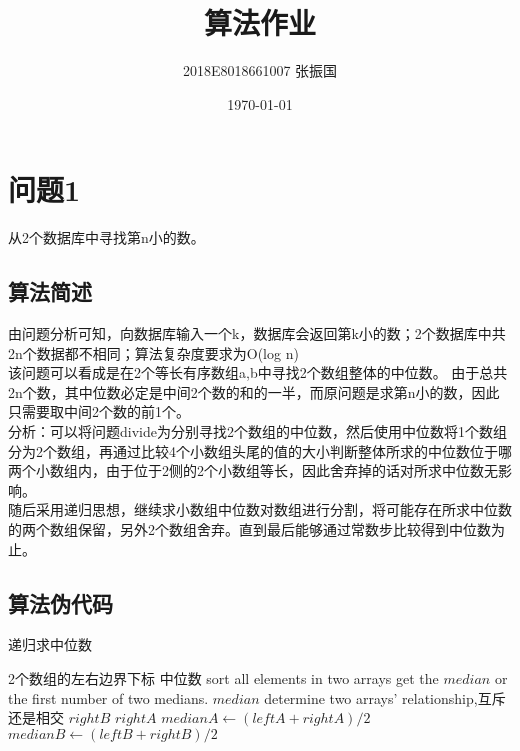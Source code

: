 \documentclass[UTF8]{ctexart}
\title{算法作业}
\author{2018E8018661007   张振国}
\date{\today}
\begin{document}
\maketitle %


\section{问题1}
从2个数据库中寻找第n小的数。

\subsection{算法简述}
由问题分析可知，向数据库输入一个k，数据库会返回第k小的数；2个数据库中共2n个数据都不相同；算法复杂度要求为O(log n)\\
该问题可以看成是在2个等长有序数组a,b中寻找2个数组整体的中位数。
由于总共2n个数，其中位数必定是中间2个数的和的一半，而原问题是求第n小的数，因此只需要取中间2个数的前1个。\\
分析：可以将问题divide为分别寻找2个数组的中位数，然后使用中位数将1个数组分为2个数组，再通过比较4个小数组头尾的值的大小判断整体所求的中位数位于哪两个小数组内，由于位于2侧的2个小数组等长，因此舍弃掉的话对所求中位数无影响。\\
随后采用递归思想，继续求小数组中位数对数组进行分割，将可能存在所求中位数的两个数组保留，另外2个数组舍弃。直到最后能够通过常数步比较得到中位数为止。

\subsection{算法伪代码}
	\begin{algorithm}[H]
		\caption{递归求中位数} 
		\begin{algorithmic}[1] %
		\Require 2个数组的左右边界下标  
            	\Ensure 中位数
            			\State sort all elements in two arrays
            			\State get the $median$ or the first number of two medians.
            		\EndIf
            		\State \Return $median$
            		\State determine two arrays' relationship,互斥还是相交
            			 \State \Return $rightB$
            			\EndIf
            			 \State \Return $rightA$
            			\EndIf
            		\Else
            			\State $medianA \gets (leftA+rightA)/2$
            			\State $medianB \gets (leftB+rightB)/2$
            				\State \Return {}
					\Else
						\State \Return {}
            			\EndIf
            		\EndIf
            	\EndFunction 
            	\State 
		\end{algorithmic}
	\end{algorithm}
\end{document}
